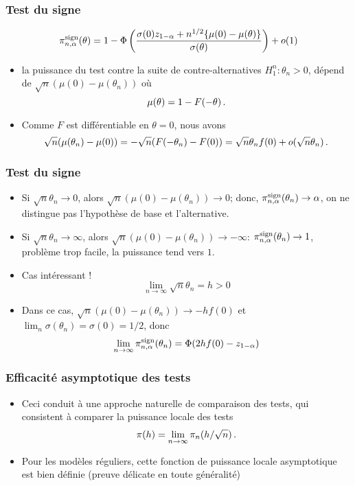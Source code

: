 \begin{frame}
\frametitle{Test du signe}
$$
\pi^{\mathrm{sign}}_{n,\alpha}(\theta)=
1 - \Phi\left( \frac{\sigma(0) z_{1-\alpha} + n^{1/2} \{ \mu(0) - \mu(\theta)\}}{\sigma(\theta)} \right) + o(1)
$$
\begin{itemize}
\item  la puissance du test contre la suite de contre-alternatives $H_1^n: \theta_n > 0$, dépend de $\sqrt{n} (\mu(0) - \mu(\theta_n))$ où
\[
\mu(\theta) = 1 - F(-\theta) \,.
\]
\item Comme $F$ est différentiable en $\theta = 0$, nous avons
\[
\sqrt{n}(\mu(\theta_n) - \mu(0))= - \sqrt{n} ( F(-\theta_n) - F(0)) =  \sqrt{n} \theta_n f(0) + o(\sqrt{n} \theta_n) \,.
\]
\end{itemize}
\end{frame}

\begin{frame}
\frametitle{Test du signe}
\begin{itemize}
\item Si $\sqrt{n} \theta_n \to 0$, alors $\sqrt{n}(\mu(0)- \mu(\theta_n)) \to
  0$; donc, $\pi_{n,\alpha}^{\mathrm{sign}}(\theta_n) \to \alpha$, on ne
  distingue pas l'hypothèse de base et l'alternative.
\item Si $\sqrt{n} \theta_n \to \infty$, alors $\sqrt{n}(\mu(0)- \mu(\theta_n)) \to -\infty$: $\pi_{n,\alpha}^{\mathrm{sign}}(\theta_n) \to 1$, problème \alert{trop facile}, la puissance tend vers $1$.
\item Cas intéressant !
\alert{
\[
\lim_{n \to \infty} \sqrt{n} \theta_n= h > 0
\]
}
\item Dans ce cas, $\sqrt{n}(\mu(0)- \mu(\theta_n)) \to -h f(0)$ et $\lim_n \sigma(\theta_n) = \sigma(0)=1/2$, donc
\alert{
\[
\lim_{n \to \infty} \pi_{n,\alpha}^{\mathrm{sign}}(\theta_n) = \Phi(2 h f(0) - z_{1-\alpha})
\]
}
\end{itemize}
\end{frame}

\begin{frame}
\frametitle{Efficacité asymptotique des tests}
\begin{itemize}
\item Ceci conduit à une approche naturelle de comparaison des tests, qui consistent à comparer la \alert{puissance locale des tests}
\alert{
\[
\pi(h)= \lim_{n \to \infty} \pi_n( h / \sqrt{n}) \,.
\]
}
\item Pour les modèles réguliers, cette fonction de \alert{puissance locale asymptotique} est bien définie (preuve délicate en toute généralité)
\end{itemize}
\end{frame}

